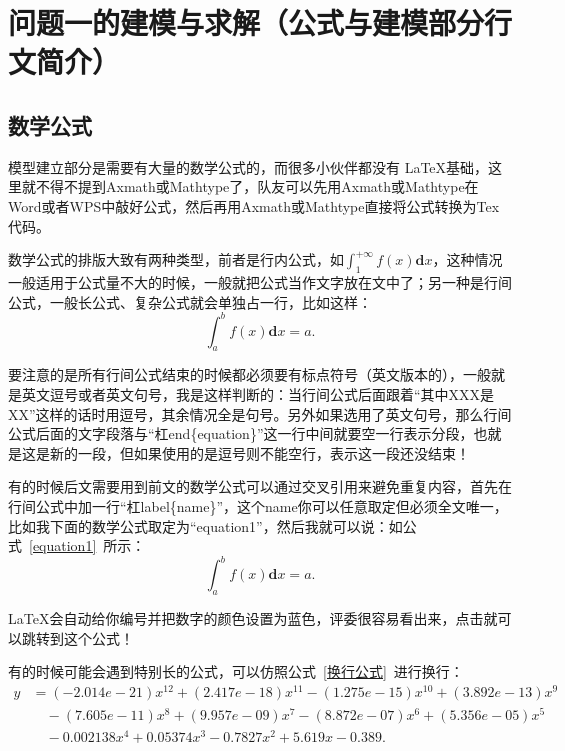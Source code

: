 \section{问题一的建模与求解（公式与建模部分行文简介）}

\subsection{数学公式}\label{subsection1}  %


模型建立部分是需要有大量的数学公式的，而很多小伙伴都没有 \LaTeX 基础，这里就不得不提到Axmath或Mathtype了，队友可以先用Axmath或Mathtype在Word或者WPS中敲好公式，然后再用Axmath或Mathtype直接将公式转换为Tex代码。


数学公式的排版大致有两种类型，前者是行内公式，如$\int_{1}^{+\infty}f(x)\textbf{d}x$，这种情况一般适用于公式量不大的时候，一般就把公式当作文字放在文中了；另一种是行间公式，一般长公式、复杂公式就会单独占一行，比如这样：
\begin{equation}
	\displaystyle\int_{a}^{b}f(x)\textbf{d}x = a.
\end{equation}

要注意的是所有行间公式结束的时候都必须要有标点符号（英文版本的），一般就是英文逗号或者英文句号，我是这样判断的：当行间公式后面跟着“其中XXX是XX”这样的话时用逗号，其余情况全是句号。另外如果选用了英文句号，那么行间公式后面的文字段落与“杠end\{equation\}”这一行中间就要空一行表示分段，也就是这是新的一段，但如果使用的是逗号则不能空行，表示这一段还没结束！

有的时候后文需要用到前文的数学公式可以通过交叉引用来避免重复内容，首先在行间公式中加一行“杠label\{name\}”，这个name你可以任意取定但必须全文唯一，比如我下面的数学公式取定为“equation1”，然后我就可以说：如公式~\ref{equation1}~所示：
\begin{equation}
	\displaystyle\int_{a}^{b}f(x)\textbf{d}x = a.
	\label{equation1}
\end{equation}

\LaTeX 会自动给你编号并把数字的颜色设置为蓝色，评委很容易看出来，点击就可以跳转到这个公式！

有的时候可能会遇到特别长的公式，可以仿照公式~\ref{换行公式}~进行换行：
\begin{equation}
	\begin{split}
		y &=(-2.014e-21){{x}^{12}}+(2.417e-18){{x}^{11}}-(1.275e-15){{x}^{10}}+(3.892e-13){{x}^{9}} \\ 
		& \quad   -(7.605e-11){{x}^{8}}+(9.957e-09){{x}^{7}}-(8.872e-07){{x}^{6}}+(5.356e-05){{x}^{5}} \\ 
		&  \quad  -0.002138{{x}^{4}}+0.05374{{x}^{3}}-0.7827{{x}^{2}}+5.619x-0.389.
	\end{split}
	\label{换行公式}
\end{equation}


